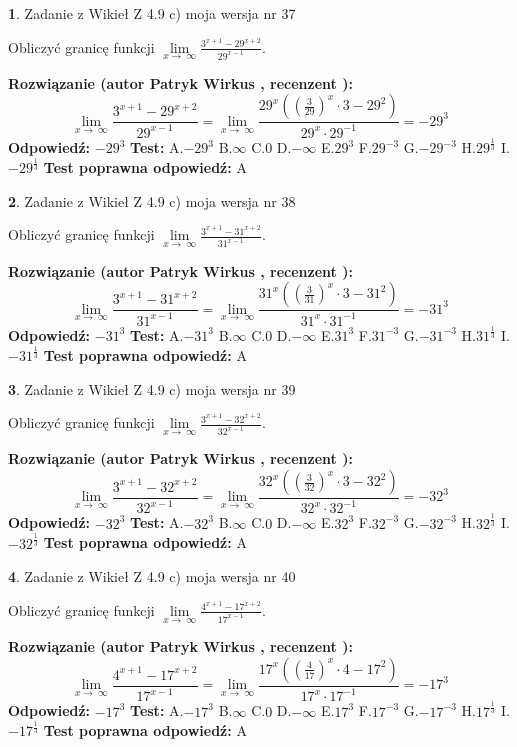 \documentclass[12pt, a4paper]{article}
\theoremstyle{definition} %
\newtheorem{zad}{}
\newcommand{\zadStart}[1]{\begin{zad}#1\newline}
\newcommand{\zadStop}{\end{zad}}
\newcommand{\rozwStart}[2]{\noindent \textbf{Rozwiązanie (autor #1 , recenzent #2): }\newline}
\newcommand{\rozwStop}{\newline}
\newcommand{\odpStart}{\noindent \textbf{Odpowiedź:}\newline}
\newcommand{\odpStop}{\newline}
\newcommand{\testStart}{\noindent \textbf{Test:}\newline}
\newcommand{\testStop}{\newline}
\newcommand{\kluczStart}{\noindent \textbf{Test poprawna odpowiedź:}\newline}
\newcommand{\kluczStop}{\newline}
\begin{document}
\zadStart{Zadanie z Wikieł Z 4.9 c) moja wersja nr 37}


Obliczyć granicę funkcji  $\lim\limits_{x\to\ \infty}\frac{3^{x+1}-29^{x+2}}{29^{x-1}}$.
\zadStop
\rozwStart{Patryk Wirkus}{}
$$\lim\limits_{x\to\ \infty}\frac{3^{x+1}-29^{x+2}}{29^{x-1}}=\lim\limits_{x\to\ \infty}\frac{29^{x}((\frac{3}{29})^{x}\cdot 3 -29^{2})}{29^{x}\cdot 29^{-1}} = -29^{3}$$
\rozwStop
\odpStart
$-29^{3}$
\odpStop
\testStart
A.$-29^{3}$ B.$\infty$ C.$0$ D.$-\infty$ E.$29^{3}$
F.$29^{-3}$ G.$-29^{-3}$
H.$29^{\frac{1}{3}}$
I.$-29^{\frac{1}{3}}$
\testStop
\kluczStart
A
\kluczStop



\zadStart{Zadanie z Wikieł Z 4.9 c) moja wersja nr 38}


Obliczyć granicę funkcji  $\lim\limits_{x\to\ \infty}\frac{3^{x+1}-31^{x+2}}{31^{x-1}}$.
\zadStop
\rozwStart{Patryk Wirkus}{}
$$\lim\limits_{x\to\ \infty}\frac{3^{x+1}-31^{x+2}}{31^{x-1}}=\lim\limits_{x\to\ \infty}\frac{31^{x}((\frac{3}{31})^{x}\cdot 3 -31^{2})}{31^{x}\cdot 31^{-1}} = -31^{3}$$
\rozwStop
\odpStart
$-31^{3}$
\odpStop
\testStart
A.$-31^{3}$ B.$\infty$ C.$0$ D.$-\infty$ E.$31^{3}$
F.$31^{-3}$ G.$-31^{-3}$
H.$31^{\frac{1}{3}}$
I.$-31^{\frac{1}{3}}$
\testStop
\kluczStart
A
\kluczStop



\zadStart{Zadanie z Wikieł Z 4.9 c) moja wersja nr 39}


Obliczyć granicę funkcji  $\lim\limits_{x\to\ \infty}\frac{3^{x+1}-32^{x+2}}{32^{x-1}}$.
\zadStop
\rozwStart{Patryk Wirkus}{}
$$\lim\limits_{x\to\ \infty}\frac{3^{x+1}-32^{x+2}}{32^{x-1}}=\lim\limits_{x\to\ \infty}\frac{32^{x}((\frac{3}{32})^{x}\cdot 3 -32^{2})}{32^{x}\cdot 32^{-1}} = -32^{3}$$
\rozwStop
\odpStart
$-32^{3}$
\odpStop
\testStart
A.$-32^{3}$ B.$\infty$ C.$0$ D.$-\infty$ E.$32^{3}$
F.$32^{-3}$ G.$-32^{-3}$
H.$32^{\frac{1}{3}}$
I.$-32^{\frac{1}{3}}$
\testStop
\kluczStart
A
\kluczStop



\zadStart{Zadanie z Wikieł Z 4.9 c) moja wersja nr 40}


Obliczyć granicę funkcji  $\lim\limits_{x\to\ \infty}\frac{4^{x+1}-17^{x+2}}{17^{x-1}}$.
\zadStop
\rozwStart{Patryk Wirkus}{}
$$\lim\limits_{x\to\ \infty}\frac{4^{x+1}-17^{x+2}}{17^{x-1}}=\lim\limits_{x\to\ \infty}\frac{17^{x}((\frac{4}{17})^{x}\cdot 4 -17^{2})}{17^{x}\cdot 17^{-1}} = -17^{3}$$
\rozwStop
\odpStart
$-17^{3}$
\odpStop
\testStart
A.$-17^{3}$ B.$\infty$ C.$0$ D.$-\infty$ E.$17^{3}$
F.$17^{-3}$ G.$-17^{-3}$
H.$17^{\frac{1}{3}}$
I.$-17^{\frac{1}{3}}$
\testStop
\kluczStart
A
\kluczStop
\end{document}
